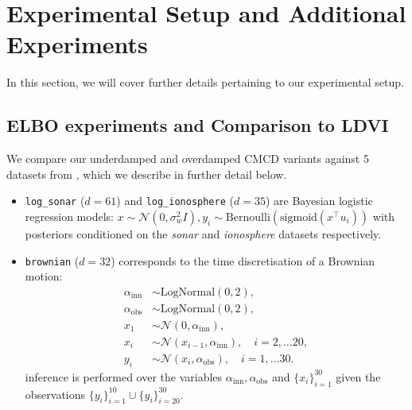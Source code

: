 \section{Experimental Setup and Additional Experiments}

In this section, we will cover further details pertaining to our experimental setup.

\subsection{ELBO experiments and Comparison to LDVI}

We compare our underdamped and overdamped CMCD variants against 5 datasets from \textcite{geffner2023langevin}, which we describe in further detail below.
\begin{itemize}
\item \texttt{log\_sonar} ($d=61$) and \texttt{log\_ionosphere} ($d=35$) are Bayesian logistic regression models: $ x \sim \mathcal{N}(0, \sigma_w^2 I),y_i \sim \mathrm{Bernoulli}(\mathrm{sigmoid}( x^\top u_i))$ with posteriors conditioned on the 
\textit{sonar} and \textit{ionosphere} datasets respectively.

\item \texttt{brownian} ($d=32$) corresponds to the time discretisation of a Brownian motion:
\begin{align*}
    \alpha_{\mathrm{inn}} &\sim \mathrm{LogNormal}(0,2),\\
    \alpha_{\mathrm{obs}} &\sim \mathrm{LogNormal}(0,2) ,\\
    x_1 &\sim \mathcal{N}(0, \alpha_{\mathrm{inn}}),\\
    x_i &\sim \mathcal{N}(x_{i-1}, \alpha_{\mathrm{inn}}), \quad i=2,\hdots 20,\\
    y_i &\sim \mathcal{N}(x_{i}, \alpha_{\mathrm{obs}}), \quad i=1,\hdots 30.
\end{align*}
inference is performed over the variables $\alpha_{\mathrm{inn}}, \alpha_{\mathrm{obs}}$ and $\{x_i\}_{i=1}^{30}$ given the observations $\{y_i\}_{i=1}^{10} \cup \{y_i\}_{i=20}^{30}$.


\end{itemize}
